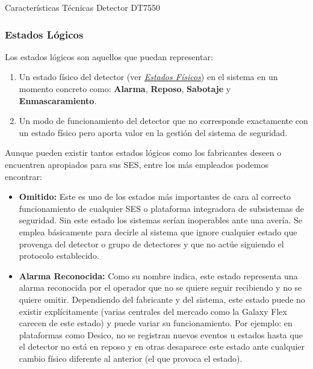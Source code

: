 \begin{table}[hp]
  \centering
  \centering
  \caption{Características Técnicas Detector DT7550 \cite{HoneywellDT7550}}
  \label{tab:dt7550-overview}
  {\small
  
  }
\end{table}

\subsubsection{Estados Lógicos}

Los estados lógicos son aquellos que puedan representar:

\begin{enumerate}
  \item Un estado físico del detector (ver \hyperref[sec:estados-fisicos]{\textit{Estados Físicos}}) en el sistema en un momento concreto como: \textbf{Alarma}, \textbf{Reposo}, \textbf{Sabotaje} y \textbf{Enmascaramiento}.
  \item Un modo de funcionamiento del detector que no corresponde exactamente con un estado físico pero aporta valor en la gestión del sistema de seguridad.
\end{enumerate}

 Aunque pueden existir tantos estados lógicos como los fabricantes deseen o encuentren apropiados para sus \acs{SES}, entre los más empleados podemos encontrar:

 \begin{itemize}
 \item \textbf{Omitido:} Este es uno de los estados más importantes de cara al correcto funcionamiento de cualquier \acs{SES} o plataforma integradora de subsistemas de seguridad. Sin este estado los sistemas serían inoperables ante una avería. Se emplea básicamente para decirle al sistema que ignore cualquier estado que provenga del detector o grupo de detectores y que no actúe siguiendo el protocolo establecido.
 \item \textbf{Alarma Reconocida:} Como su nombre indica, este estado representa una alarma reconocida por el operador que no se quiere seguir recibiendo y no se quiere omitir. Dependiendo del fabricante y del sistema, este estado puede no existir explícitamente (varias centrales del mercado como la Galaxy Flex \cite{Honeywell} carecen de este estado) y puede variar su funcionamiento. Por ejemplo: en plataformas como Desico, no se registran nuevos eventos u estados hasta que el  detector no está en reposo y en otras desaparece este estado ante cualquier cambio físico diferente al anterior (el que provoca el estado).
 \end{itemize}

